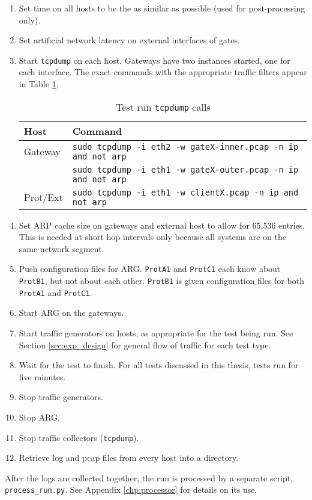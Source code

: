 \begin{enumerate}
\item Set time on all hosts to be the as similar as possible (used for post-processing only).
\item Set artificial network latency on external interfaces of gates.
\item Start \texttt{tcpdump} on each host. Gateways have two instances started, one for each interface. The exact commands with the appropriate traffic filters appear in Table \ref{tbl:test_tcpdump_calls}.
\begin{table}
\caption{Test run \texttt{tcpdump} calls}
\label{tbl:test_tcpdump_calls}
\centering
\begin{tabular}{ll}
\toprule
\textbf{Host} & \textbf{Command}\\
\hline
Gateway & \texttt{sudo tcpdump -i eth2 -w gateX-inner.pcap -n ip and not arp}\\
	& \texttt{sudo tcpdump -i eth1 -w gateX-outer.pcap -n ip and not arp}\\
\hline
Prot/Ext & \texttt{sudo tcpdump -i eth1 -w clientX.pcap -n ip and not arp}\\
\bottomrule
\end{tabular}
\end{table}

\item Set \ac{ARP} cache size on gateways and external host to allow for 65,536 entries. This is needed at short hop intervals only because all systems are on the same network segment.
\item Push configuration files for \ac{ARG}. \texttt{ProtA1} and \texttt{ProtC1} each know about \texttt{ProtB1}, but not about each other. \texttt{ProtB1} is given configuration files for both \texttt{ProtA1} and \texttt{ProtC1}.
\item Start \ac{ARG} on the gateways. 
\item Start traffic generators on hosts, as appropriate for the test being run. See Section \ref{sec:exp_design} for general flow of traffic for each test type.
\item Wait for the test to finish. For all tests discussed in this thesis, tests run for five minutes.
\item Stop traffic generators.
\item Stop \ac{ARG}.
\item Stop traffic collectors (\texttt{tcpdump}).
\item Retrieve log and pcap files from every host into a directory.
\end{enumerate}

\par After the logs are collected together, the run is processed by a separate script, \texttt{process\_run.py}. See Appendix \ref{chp:processor} for details on its use. 


